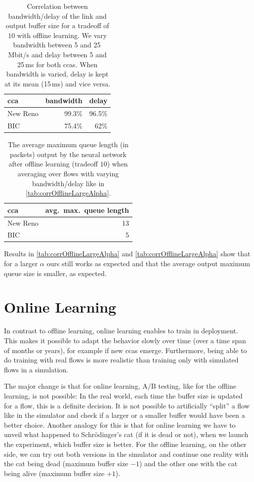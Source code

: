 \documentclass[conference]{IEEEtran}
\begin{document}
\begin{table}[h]
\caption{Correlation between bandwidth/delay of the link and output buffer size for a tradeoff of $10$ with offline learning. We vary bandwidth between 5 and 25\,Mbit/s and delay between 5 and 25\,ms for both \glspl{cca}. When bandwidth is varied, delay is kept at its mean (15\,ms) and vice versa.} \label{tab:corrOfflineLargeAlpha}
\centering
\begin{tabular}{lrr} \toprule
\gls{cca} & bandwidth & delay \\ \midrule
New Reno & 99.3\% & 96.5\% \\
BIC & 75.4\% & 62\% \\
\bottomrule
\end{tabular}
\end{table}

\begin{table}[h]
\caption{The average maximum queue length (in packets) output by the neural network after offline learning (tradeoff $10$) when averaging over flows with varying bandwidth/delay like in \autoref{tab:corrOfflineLargeAlpha}.} \label{tab:avgOfflineLargeAlpha}
\centering
\begin{tabular}{lr} \toprule
\gls{cca} & avg.~max.~queue length \\ \midrule
New Reno & 13 \\
BIC & 5 \\
\bottomrule
\end{tabular}
\end{table}

Results in \autoref{tab:corrOfflineLargeAlpha} and \autoref{tab:corrOfflineLargeAlpha} show that for a larger $\alpha$ \gls{ours} still works as expected and that the average output maximum queue size is smaller, as expected. 

\section{Online Learning}

In contrast to offline learning, online learning enables to train in deployment. This makes it possible to adapt the behavior slowly over time (over a time span of months or years), for example if new \glspl{cca} emerge. Furthermore, being able to do training with real flows is more realistic than training only with simulated flows in a simulation. 

The major change is that for online learning, A/B testing, like for the offline learning, is not possible: In the real world, each time the buffer size is updated for a flow, this is a definite decision. It is not possible to artificially ``split'' a flow like in the simulator and check if a larger or a smaller buffer would have been a better choice. Another analogy for this is that for online learning we have to unveil what happened to Schrödinger's cat (if it is dead or not), when we launch the experiment, which buffer size is better. For the offline learning, on the other side, we can try out both versions in the simulator and continue one reality with the cat being dead (maximum buffer size $-1$) and the other one with the cat being alive (maximum buffer size $+1$). 
\end{document}
